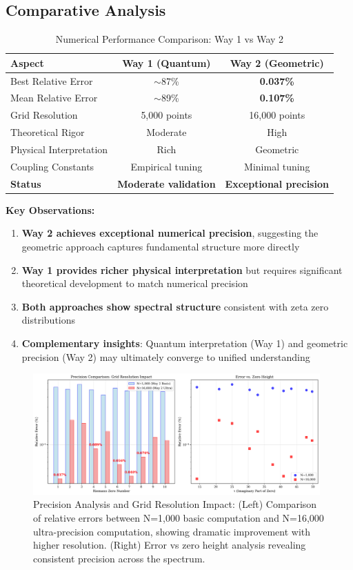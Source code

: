 \documentclass[12pt]{article}
\begin{document}
\subsection{Comparative Analysis}

\begin{table}[h]
\centering
\caption{Numerical Performance Comparison: Way 1 vs Way 2}
\begin{tabular}{lcc}
\toprule
\textbf{Aspect} & \textbf{Way 1 (Quantum)} & \textbf{Way 2 (Geometric)} \\
\midrule
Best Relative Error & $\sim$87\% & \textbf{0.037\%} \\
Mean Relative Error & $\sim$89\% & \textbf{0.107\%} \\
Grid Resolution & 5,000 points & 16,000 points \\
Theoretical Rigor & Moderate & High \\
Physical Interpretation & Rich & Geometric \\
Coupling Constants & Empirical tuning & Minimal tuning \\
\textbf{Status} & \textbf{Moderate validation} & \textbf{Exceptional precision} \\
\bottomrule
\end{tabular}
\end{table}

\textbf{Key Observations:}
\begin{enumerate}
\item \textbf{Way 2 achieves exceptional numerical precision}, suggesting the geometric approach captures fundamental structure more directly
\item \textbf{Way 1 provides richer physical interpretation} but requires significant theoretical development to match numerical precision
\item \textbf{Both approaches show spectral structure} consistent with zeta zero distributions
\item \textbf{Complementary insights}: Quantum interpretation (Way 1) and geometric precision (Way 2) may ultimately converge to unified understanding
\end{enumerate}

\begin{figure}[h]
\centering
\includegraphics[width=0.98\textwidth]{precision_comparison.png}
\caption{Precision Analysis and Grid Resolution Impact: (Left) Comparison of relative errors between N=1,000 basic computation and N=16,000 ultra-precision computation, showing dramatic improvement with higher resolution. (Right) Error vs zero height analysis revealing consistent precision across the spectrum.}
\label{fig:precision_comparison}
\end{figure}
\end{document}

